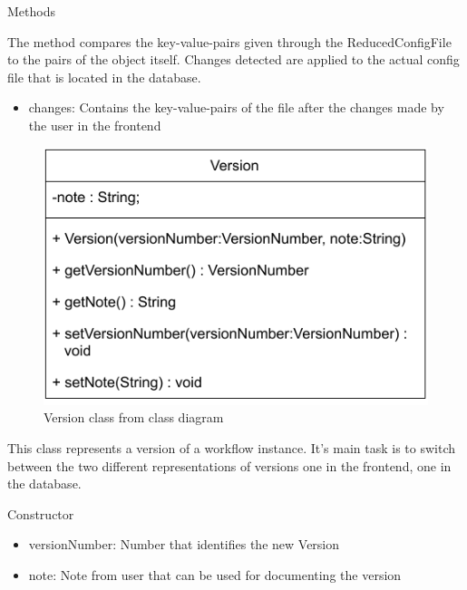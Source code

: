 \begin{methodenv}{Methods}


The method compares the key-value-pairs given through the ReducedConfigFile to the pairs of the object itself. Changes detected are applied to the actual config file that is located in the database.

\begin{itemize}
	\item{changes:}
	Contains the key-value-pairs of the file after the changes made by the user in the frontend
\end{itemize}
\end{methodenv}



\begin{figure}[h]
\centerline{\includegraphics[scale=1]{res/Klassen/Version.pdf}}
\caption{Version class from class diagram}
\end{figure}

This class represents a version of a workflow instance. It's main task is to switch between the two different representations of versions one in the frontend, one in the database.
\begin{methodenv}{Constructor}



\begin{itemize}
	\item{versionNumber:}
	Number that identifies the new Version
	\item{note:}
	Note from user that can be used for documenting the version
\end{itemize}
\end{methodenv}


